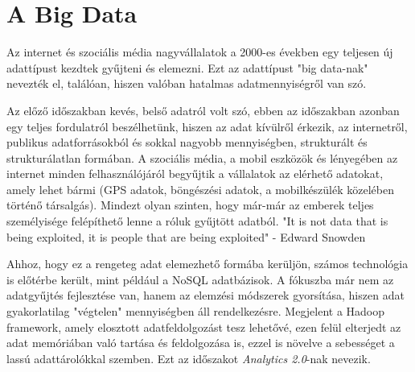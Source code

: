 \section{A Big Data}

Az internet és szociális média nagyvállalatok a 2000-es években egy teljesen új adattípust kezdtek gyűjteni és elemezni. Ezt az adattípust "big data-nak" nevezték el, találóan, hiszen valóban hatalmas adatmennyiségről van szó.

Az előző időszakban kevés, belső adatról volt szó, ebben az időszakban azonban egy teljes fordulatról beszélhetünk, hiszen az adat kívülről érkezik, az internetről, publikus adatforrásokból és sokkal nagyobb mennyiségben, strukturált és strukturálatlan formában. A szociális média, a mobil eszközök és lényegében az internet minden felhasználójáról begyűjtik a vállalatok az elérhető adatokat, amely lehet bármi (GPS adatok, böngészési adatok, a mobilkészülék közelében történő társalgás). Mindezt olyan szinten, hogy már-már az emberek teljes személyisége felépíthető lenne a róluk gyűjtött adatból. "It is not data that is being exploited, it is people that are being exploited" - Edward Snowden

Ahhoz, hogy ez a rengeteg adat elemezhető formába kerüljön, számos technológia is előtérbe került, mint például a NoSQL adatbázisok. A fókuszba már nem az adatgyűjtés fejlesztése van, hanem az elemzési módszerek gyorsítása, hiszen adat gyakorlatilag "végtelen" mennyiségben áll rendelkezésre. Megjelent a Hadoop framework, amely elosztott adatfeldolgozást tesz lehetővé, ezen felül elterjedt az adat memóriában való tartása és feldolgozása is, ezzel is növelve a sebességet a lassú adattárolókkal szemben. Ezt az időszakot \textit{Analytics 2.0}-nak nevezik.

